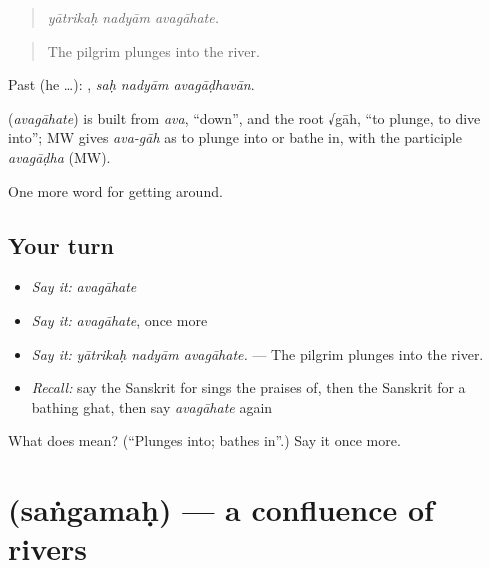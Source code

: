 \begin{quote}
  
\end{quote}

\begin{quote}
\emph{yātrikaḥ nadyām avagāhate.}
\end{quote}

\begin{quote}
The pilgrim plunges into the river.
\end{quote}

Past (he …):   , \emph{saḥ nadyām avagāḍhavān}.

\begin{cousinweb}
\textbf{} (\emph{avagāhate}) is built from \emph{ava}, \textquotedblleft{}down\textquotedblright{}, and the root √gāh, \textquotedblleft{}to plunge, to dive into\textquotedblright{}; MW gives \emph{ava-gāh} as to plunge into or bathe in, with the participle \emph{avagāḍha} (MW).
\end{cousinweb}

\begin{grammarlens}[title={What you've built}]
One more word for getting around.
\end{grammarlens}

\subsection*{Your turn}
\begin{itemize}
\raggedright
  \item \emph{Say it:} \emph{avagāhate}
  \item \emph{Say it:} \emph{avagāhate}, once more
  \item \emph{Say it:} \emph{yātrikaḥ nadyām avagāhate.} — The pilgrim plunges into the river.
  \item \emph{Recall:} say the Sanskrit for sings the praises of, then the Sanskrit for a bathing ghat, then say \emph{avagāhate} again
\end{itemize}

\begin{tcolorbox}[breakable,colback=teal!4,colframe=teal!35!black,title={Before you move on}]
What does  mean? (\textquotedblleft{}Plunges into; bathes in\textquotedblright{}.) Say it once more.
\end{tcolorbox}
\section[\texorpdfstring{\sk{संगमः} (saṅgamaḥ)}{संगमः (saṅgamaḥ)}]{ (saṅgamaḥ) — a confluence of rivers}

